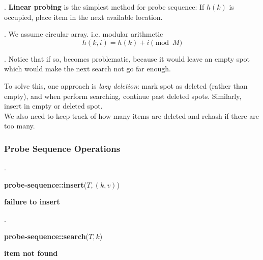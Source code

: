 \documentclass{article}
\begin{document}
\begin{deff}.
    \textbf{Linear probing} is the simplest method for probe sequence: If $h(k)$ is occupied, place item in the next available location. 
\end{deff}

\begin{comm}[].
    We assume circular array. i.e. modular arithmetic 
    \[ h(k, i) = h(k) + i \pmod{M} \] 
\end{comm}

\begin{discovery}[].
    Notice that if so,  becomes problematic, because it would leave an empty spot which would make the next search not go far enough.
\end{discovery}

\begin{solution}
    To solve this, one approach is \textit{lazy deletion}: mark spot as deleted (rather than empty), and when perform searching, continue past deleted spots. Similarly, insert in empty or deleted spot. \\ 
    We also need to keep track of how many items are deleted and rehash if there are too many. 
\end{solution}

\subsubsection{Probe Sequence Operations} 

\begin{codes}[Insert]. 
    \begin{algorithm}[H]
        \textbf{probe-sequence::insert}($T, (k,v)$) 

        \Return \textbf{failure to insert}
    \end{algorithm}
\end{codes}

\begin{codes}[Delete].
    \begin{algorithm}[H]
        \textbf{probe-sequence::search}($T, k$) 

        \Return \textbf{item not found}
    \end{algorithm}
\end{codes}
\end{document}
